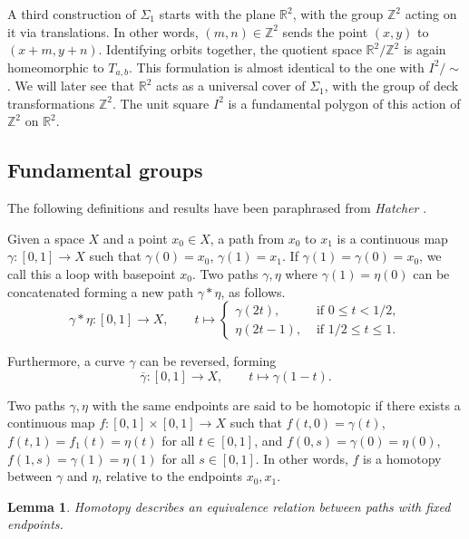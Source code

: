 \documentclass[12pt]{article}
\newcommand{\Z}{\mathbb{Z}}
\newcommand{\R}{\mathbb{R}}
\newtheorem{lemma}[theorem]{Lemma}
\theoremstyle{definition}
\theoremstyle{remark}
\begin{document}
    A third construction of $\Sigma_1$ starts with the plane $\R^2$, with the group
    $\Z^2$ acting on it via translations. In other words, $(m, n)\in \Z^2$ sends the
    point $(x, y)$ to $(x + m, y + n)$. Identifying orbits together, the quotient
    space $\R^2 / \Z^2$ is again homeomorphic to $T_{a, b}$. This formulation is
    almost identical to the one with $I^2 / \sim$. We will later see that $\R^2$ acts
    as a universal cover of $\Sigma_1$, with the group of deck transformations
    $\Z^2$. The unit square $I^2$ is a fundamental polygon of this action of $\Z^2$
    on $\R^2$.


    \subsection{Fundamental groups}

    The following definitions and results have been paraphrased from \emph{Hatcher}
    \cite{hatcher}.

    Given a space $X$ and a point $x_0 \in X$, a path from $x_0$ to $x_1$ is a
    continuous map $\gamma\colon [0, 1] \to X$ such that $\gamma(0) = x_0$,
    $\gamma(1) = x_1$. If $\gamma(1) = \gamma(0) = x_0$, we call this a loop with
    basepoint $x_0$. Two paths $\gamma, \eta$ where $\gamma(1) = \eta(0)$ can be
    concatenated forming a new path $\gamma * \eta$, as follows. \[
        \gamma * \eta\colon [0, 1] \to X, \qquad
        t \mapsto \begin{cases}
            \gamma(2t), &\text{ if } 0 \leq t < 1 / 2, \\
            \eta(2t - 1), &\text{ if } 1 / 2 \leq t \leq 1.
        \end{cases}
    \]

    Furthermore, a curve $\gamma$ can be reversed, forming \[
        \overline{\gamma}\colon [0, 1] \to X, \qquad
        t \mapsto \gamma(1 - t).
    \]

    Two paths $\gamma, \eta$ with the same endpoints are said to be homotopic if
    there exists a continuous map $f\colon [0, 1] \times [0, 1] \to X$ such that
    $f(t, 0) = \gamma(t)$, $f(t, 1) = f_1(t) = \eta(t)$ for all $t \in [0, 1]$, and
    $f(0, s) = \gamma(0) = \eta(0)$, $f(1, s) = \gamma(1) = \eta(1)$ for all $s \in
    [0, 1]$. In other words, $f$ is a homotopy between $\gamma$ and $\eta$, relative
    to the endpoints $x_0, x_1$. \\

    \begin{lemma}
        Homotopy describes an equivalence relation between paths with fixed endpoints.
    \end{lemma}
\end{document}
